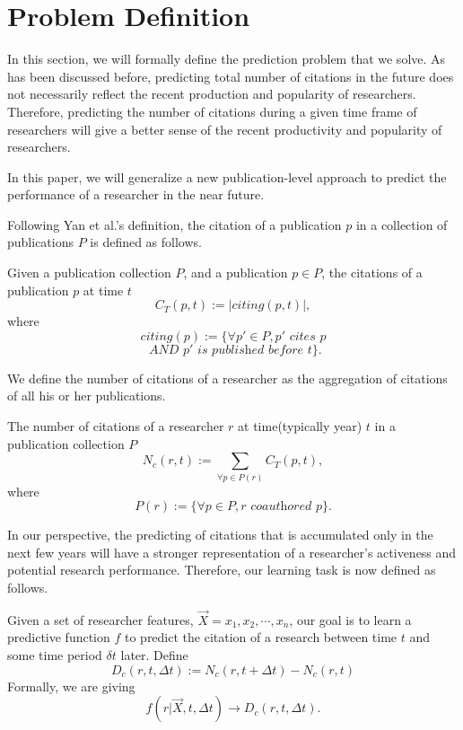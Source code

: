 \section{Problem Definition}
In this section, we will formally define the prediction problem that we solve.
As has been discussed before, predicting total number of citations in the future does not necessarily reflect the recent production and popularity of researchers. Therefore, predicting the number of citations during a given time frame of researchers will give a better sense of the recent productivity and popularity of researchers.

In this paper, we will generalize a new publication-level approach to predict the performance of a researcher in the near future.

Following Yan et al.'s definition\cite{yan2011citation}, the citation of a publication $p$ in a collection of publications $P$ is defined as follows.

\begin{definition}
Given a publication collection $P$, and a publication $p\in P$, the citations of a publication $p$ at time $t$
\[C_T(p,t):=|citing(p,t)|,\]
where
\[citing(p):=\{\forall p'\in P, p' \textit{ cites } p \]
\[\textit{ AND } p' \textit{ is published before } t \}.\]
\end{definition}

We define the number of citations of a researcher as the aggregation of citations of all his or her publications.

\begin{definition}
The number of citations of a researcher $r$ at time(typically year) $t$ in a publication collection $P$
\[N_c(r,t):=\sum_{\forall p \in P(r)} C_T(p,t),\]
where
\[P(r):=\{\forall p \in P, r \textit{ coauthored } p\}.\]
\label{def-author-citations}
\end{definition}

In our perspective, the predicting of citations that is accumulated only in the next few years
will have a stronger representation of a researcher's activeness and potential research performance.
Therefore, our learning task is now defined as follows.

\begin{definition}
Given a set of researcher features, $\vec{X}=x_1,x_2,\cdots,x_n$, our goal is to learn a predictive function $f$ to predict the citation
of a research between time $t$ and some time period $\delta t$ later. Define
\[D_c(r,t,\Delta t):=N_c(r,t+\Delta t)-N_c(r,t)\]
Formally, we are giving
\[f(r|\vec{X},t,\Delta t)\rightarrow D_c(r,t,\Delta t).\]
\end{definition}
